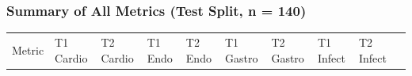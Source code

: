\documentclass[
  american,
  a4paper,
]{article}
\begin{document}
\subsubsection{Summary of All Metrics (Test Split, n =
140)}\label{summary-of-all-metrics-test-split-n-140}

\begin{longtable}[]{@{}
  >{\raggedright\arraybackslash}p{}
  >{\raggedright\arraybackslash}p{}
  >{\raggedright\arraybackslash}p{}
  >{\raggedright\arraybackslash}p{}
  >{\raggedright\arraybackslash}p{}
  >{\raggedright\arraybackslash}p{}
  >{\raggedright\arraybackslash}p{}
  >{\raggedright\arraybackslash}p{}
  >{\raggedright\arraybackslash}p{}
  >{\raggedright\arraybackslash}p{}@{}}
\toprule\noalign{}
\begin{minipage}[b]{\linewidth}\raggedright
Metric
\end{minipage} & \begin{minipage}[b]{\linewidth}\raggedright
T1 Cardio
\end{minipage} & \begin{minipage}[b]{\linewidth}\raggedright
T2 Cardio
\end{minipage} & \begin{minipage}[b]{\linewidth}\raggedright
T1 Endo
\end{minipage} & \begin{minipage}[b]{\linewidth}\raggedright
T2 Endo
\end{minipage} & \begin{minipage}[b]{\linewidth}\raggedright
T1 Gastro
\end{minipage} & \begin{minipage}[b]{\linewidth}\raggedright
T2 Gastro
\end{minipage} & \begin{minipage}[b]{\linewidth}\raggedright
T1 Infect
\end{minipage} & \begin{minipage}[b]{\linewidth}\raggedright
T2 Infect
\end{minipage} & \begin{minipage}[b]{\linewidth}\raggedright

\end{minipage}
\end{longtable}
\end{document}
